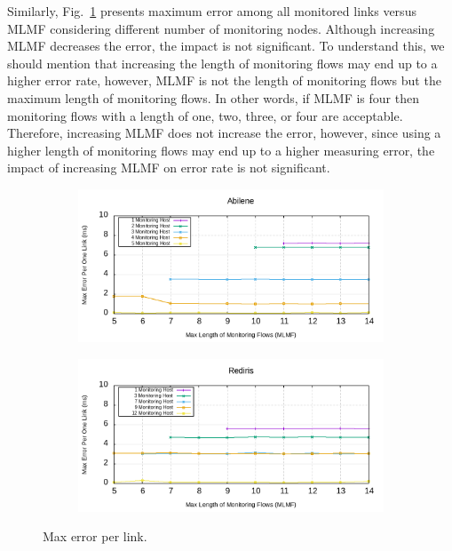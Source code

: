 \documentclass[10pt, journal, letterpaper]{IEEEtran}
\begin{document}
Similarly, Fig.~\ref{fig:max_error_abilen} presents maximum error among all monitored links versus MLMF considering different number of monitoring nodes. Although increasing MLMF decreases the error, the impact is not significant. To understand this, we should mention that increasing the length of monitoring flows may end up to a higher error rate, however, MLMF is not the length of monitoring flows but the maximum length of monitoring flows. In other words, if MLMF is four then monitoring flows with a length of one, two, three, or four are acceptable. Therefore, increasing MLMF does not increase the error, however, since using a higher length of monitoring flows may end up to a higher measuring error, the impact of increasing MLMF on error rate is not significant.
\begin{figure}
    \begin{subfigure}{0.49\columnwidth}
       \centering
        \includegraphics[width=\columnwidth]{img/eval_Abilene_Max_Length_of_Max_error_per_one_link.png}
    \end{subfigure}
    \begin{subfigure}{0.49\columnwidth}
      \centering
      \includegraphics[width=\columnwidth]{img/eval_Rediris_Max_Length_of_Max_error_per_one_link.png}
    \end{subfigure}
    \caption{Max error per link.}
    \label{fig:max_error_abilen}
\end{figure} 
\end{document}
